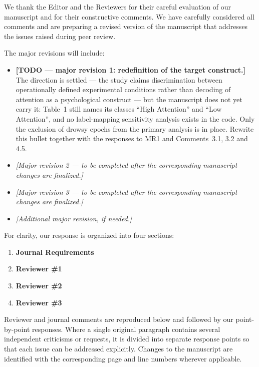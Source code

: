 \documentclass{article}
\begin{document}
\vspace{0.2cm}
\noindent
We thank the Editor and the Reviewers for their careful evaluation of our
manuscript and for their constructive comments. We have carefully considered all
comments and are preparing a revised version of the manuscript that addresses
the issues raised during peer review.

\vspace{0.2cm}
\noindent
The major revisions will include:

\begin{itemize}
	\item \textbf{[TODO --- major revision 1: redefinition of the target
	      construct.]} The direction is settled --- the study claims
	      discrimination between operationally defined experimental conditions
	      rather than decoding of attention as a psychological construct --- but
	      the manuscript does not yet carry it: Table~1 still names its classes
	      ``High Attention'' and ``Low Attention'', and no label-mapping
	      sensitivity analysis exists in the code. Only the exclusion of drowsy
	      epochs from the primary analysis is in place. Rewrite this bullet
	      together with the responses to MR1 and Comments~3.1, 3.2 and 4.5.
	\item \emph{[Major revision 2 --- to be completed after the corresponding manuscript changes are finalized.]}
	\item \emph{[Major revision 3 --- to be completed after the corresponding manuscript changes are finalized.]}
	\item \emph{[Additional major revision, if needed.]}
\end{itemize}

\noindent
For clarity, our response is organized into four sections:

\begin{enumerate}
	\item \textbf{Journal Requirements}
	\item \textbf{Reviewer \#1}
	\item \textbf{Reviewer \#2}
	\item \textbf{Reviewer \#3}
\end{enumerate}

\noindent
Reviewer and journal comments are reproduced below and followed by our
point-by-point responses. Where a single original paragraph contains several
independent criticisms or requests, it is divided into separate response points
so that each issue can be addressed explicitly. Changes to the manuscript are
identified with the corresponding page and line numbers wherever applicable.
\end{document}
